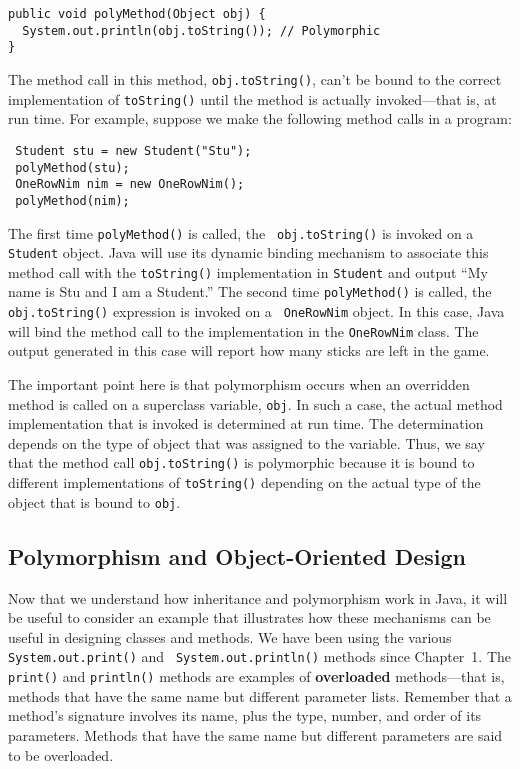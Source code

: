 \begin{jjjlisting}
\begin{lstlisting}
public void polyMethod(Object obj) {
  System.out.println(obj.toString()); // Polymorphic
}
\end{lstlisting}
\end{jjjlisting}

\noindent The method call in this method, {\tt obj.toString()}, can't
be bound to the correct implementation of {\tt toString()} until the
method is actually invoked---that is, at run time.  For example,
suppose we make the following method calls in a program:

\begin{jjjlisting}
\begin{lstlisting}
 Student stu = new Student("Stu");
 polyMethod(stu);
 OneRowNim nim = new OneRowNim();
 polyMethod(nim);  
\end{lstlisting}
\end{jjjlisting}

\noindent The first time {\tt polyMethod()} is called, the {\tt
obj.toString()} is invoked on a {\tt Student} object.  Java will use
its dynamic binding mechanism to associate this method call with the
{\tt toString()} implementation in {\tt Student} and output ``My name
is Stu and I am a Student.''  The second time {\tt polyMethod()} is
called, the {\tt obj.toString()} expression is invoked on a {\tt
OneRowNim} object. In this case, Java will bind the method call to the
implementation in the {\tt OneRowNim} class. The output generated in
this case will report how many sticks are left in the game. 

The important point here is that polymorphism occurs when an
overridden method is called on a superclass variable, {\tt obj}. In
such a case, the actual method implementation that is invoked is
determined at run time.  The determination depends on the type of
object that was assigned to the variable.  Thus, we say that the
method call {\tt obj.toString()} is polymorphic because it is bound to
different implementations of {\tt toString()} depending on the actual
type of the object that is bound to {\tt obj}.


\subsection{Polymorphism and Object-Oriented Design}

Now that we understand how inheritance and polymorphism work in Java,
it will be useful to consider an example that illustrates how these
mechanisms can be useful in designing classes and methods.  We have
been using the various {\tt System.out.print()} and {\tt
System.out.println()} methods since Chapter~1.  The {\tt print()} and
{\tt println()} methods are examples of {\bf overloaded}
methods---that is, methods that have the same name but different
parameter lists.  Remember that a method's signature involves its
name, plus the type, number, and order of its parameters. Methods that
have the same name but different parameters are said to be overloaded.

